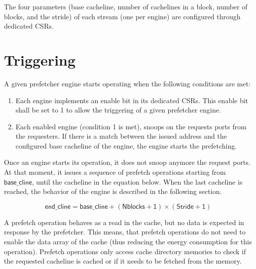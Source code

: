 \documentclass[10pt,titlepage,twoside]{book}
\begin{document}
The four parameters (base cacheline, number of cachelines in a block, number of blocks, and the stride) of each stream (one per engine) are configured through dedicated \acp{CSR}.

\section{Triggering}

A given prefetcher engine starts operating when the following conditions are met:

\begin{enumerate}
\item Each engine implements an enable bit in its dedicated \acp{CSR}.
This enable bit shall be set to 1 to allow the triggering of a given prefetcher engine.

\item Each enabled engine (condition 1 is met), snoops on the requests ports from the requesters.
If there is a match between the issued address and the configured base cacheline of the engine, the engine starts the prefetching.

\end{enumerate}

Once an engine starts its operation, it does not snoop anymore the request ports.
At that moment, it issues a sequence of prefetch operations starting from $\mathsf{base\_cline}$, until the cacheline in the equation below.
When the last cacheline is reached, the behavior of the engine is described in the following section.

\begin{equation*}
    \mathsf{end\_cline = base\_cline + (Nblocks + 1)\times{}(Stride + 1)}
\end{equation*}

A prefetch operation behaves as a read in the cache, but no data is expected in response by the prefetcher.
This means, that prefetch operations do not need to enable the data array of the cache (thus reducing the energy consumption for this operation).
Prefetch operations only access cache directory memories to check if the requested cacheline is cached or if it needs to be fetched from the memory.
\end{document}
